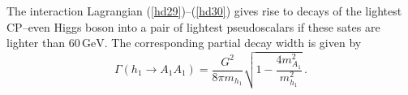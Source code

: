 \documentclass[12pt,a4paper]{article}
\newcommand{\ds}{\displaystyle}
\begin{document}
The interaction Lagrangian (\ref{hd29})--(\ref{hd30}) gives rise to decays of the lightest CP--even Higgs boson into
a pair of lightest pseudoscalars if these sates are lighter than $60\,\mbox{GeV}$. The corresponding partial decay width is given by
\begin{equation}
\Gamma(h_1\to A_1 A_1)=\dfrac{G^2}{8\pi m_{h_1}}\sqrt{1-\dfrac{4 m_{A_1}^2}{m_{h_1}^2}}\,.
\label{31}
\end{equation}





























\end{document}
